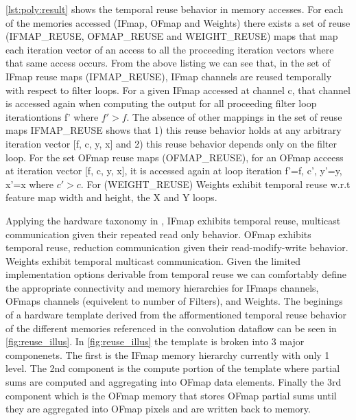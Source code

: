 \autoref{lst:poly:result} shows the temporal reuse behavior in memory accesses. For each
of the memories accessed (IFmap, OFmap and Weights) there exists a set of reuse
(IFMAP\_REUSE, OFMAP\_REUSE and WEIGHT\_REUSE) maps that map each iteration
vector of an access to all the proceeding iteration vectors where that same
access occurs. From the above listing we can see that, in the set of IFmap reuse
maps (IFMAP\_REUSE), IFmap channels are reused temporally with respect to filter
loops. For a given IFmap accessed at channel c, that channel is accessed again
when computing the output for all proceeding filter loop iterationtions f' where
$f'>f$. The absence of other mappings in the set of reuse maps IFMAP\_REUSE shows
that 1) this reuse behavior holds at any arbitrary iteration vector [f, c, y, x]
and 2) this reuse behavior depends only on the filter loop. For the set OFmap
reuse maps (OFMAP\_REUSE), for an OFmap acceess at iteration vector [f, c, y,
x], it is accessed again at loop iteration f'=f, c', y'=y, x'=x where $c'>c$.  
For (WEIGHT\_REUSE) Weights exhibit temporal reuse w.r.t feature map width and
height, the X and Y loops. 

Applying the hardware taxonomy in \cite{maestro}, IFmap exhibits temporal reuse,
multicast communication given their repeated read only behavior. OFmap exhibits temporal reuse, reduction communication
given their read-modify-write behavior. Weights exhibit temporal multicast
communication. Given the limited implementation options derivable from temporal
reuse we can comfortably define the appropriate connectivity and memory
hierarchies for IFmaps channels, OFmaps channels (equivelent to number of
Filters), and Weights. The beginings of a hardware template derived from the
afformentioned temporal reuse behavior of the different memories referenced in
the convolution dataflow can be seen in \ref{fig:reuse_illus}. In
\ref{fig:reuse_illus} the template is broken into 3 major componenets. The first
is the IFmap memory hierarchy currently with only 1 level. The 2nd component is
the compute portion of the template where partial sums are computed and
aggregating into OFmap data elements. Finally the 3rd component which is the
OFmap memory that stores OFmap partial sums until they are aggregated into OFmap
pixels and are written back to memory.

